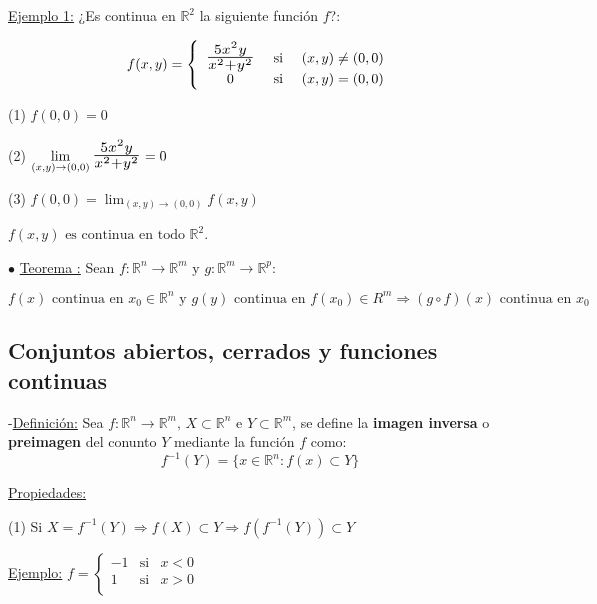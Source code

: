 \documentclass[12pt, titlepage]{article}
\newcommand{\R}{\mathbb{R}}
\newcommand{\bfrac}[2]{\scalebox{1.4}{$\frac{#1}{#2}$}}
\newcommand{\definicion}{\noindent-\underline{Definición:} }
\newcommand{\teorema}[1][\!\!]{\noindent$\bullet$ \underline{Teorema #1:} }
\newcommand{\dindent}{\indent\indent}
\newcommand{\tindent}{\indent\indent\indent}
\begin{document}
\underline{Ejemplo 1:} ¿Es continua en $\R^2$ la siguiente función $f$?:

\[
f (x, y) = \left \{
\begin{array}{ccc}

\bfrac{5x^2y}{x^2 + y^2} & \text{ si } & (x, y) \neq (0, 0) \\
0 & \text{ si } & (x, y) = (0, 0)\\

\end{array}\right.
\]

(1) $f (0, 0) = 0$
\vspace{3mm}

(2) $\displaystyle \lim_{(x, y) \to (0, 0)} \bfrac{5x^2y}{x^2 + y^2} = 0$
\vspace{3mm}

(3) $f (0, 0) = \displaystyle \lim_{(x, y) \to (0, 0)} f (x, y)$
\vspace{3mm}

$f (x, y) \text{ es continua en todo } \R^2$.
\vspace{5mm}

\teorema Sean $f : \R^n \to \R^m \text{ y } g : \R^m \to \R^p$:

\[
\boxed{
f (x) \text{ continua en } x_0 \in \R^n \text{ y } g (y) \text{ continua en } f (x_0) \in R^m \Rightarrow 
(g \circ f) (x) \text{ continua en } x_0
}
\]
\vspace{0mm}


\subsection{Conjuntos abiertos, cerrados y funciones continuas}
\vspace{3mm}

\definicion Sea $f : \R^n \to \R^m, \, X \subset \R^n \text{ e } Y \subset \R^m$, se define la 
\textbf{imagen inversa} o \textbf{preimagen} del conunto $Y$ mediante la función $f$ como:
\[
\boxed{
f^{-1} (Y) = \{x \in \R^n : f (x) \subset Y\}
}
\]
\vspace{3mm}

\underline{Propiedades:}
\vspace{3mm}

\dindent (1) Si $X = f^{-1} (Y) \Rightarrow f (X) \subset Y \Rightarrow f (f^{-1} (Y)) \subset Y$
\vspace{3mm}

\tindent \underline{Ejemplo:} $f = 
\left \{ \begin{array}{ccc}

-1 & \text{si} & x < 0\\
1 & \text{si} & x>0\\

\end{array}\right.$
\vspace{2mm}
\end{document}
